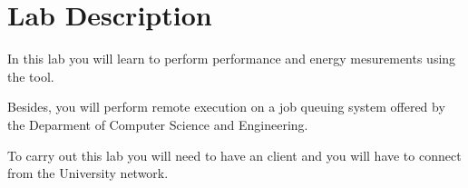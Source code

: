 \section{Lab Description}

In this lab you will learn to perform performance and energy mesurements
using the  tool.

Besides, you will perform remote execution on a job queuing system offered
by the Deparment of Computer Science and Engineering.

To carry out this lab you will need to have an  client and you will
have to connect from the University network.
